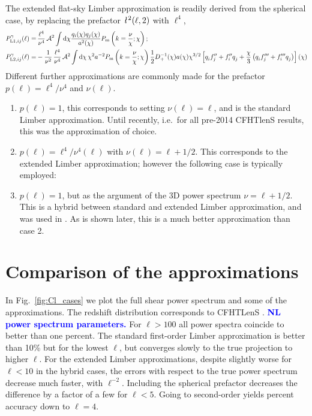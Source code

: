 \documentclass[fleqn,usenatbib]{mnras} %
\newcommand{\ellbar}{\hbox{\it \l}\,}
\newcommand{\pref}{{\cal A}}
\newcommand{\mk}[1]{{\bf\textcolor{blue}{#1}}}
\begin{document}
The extended flat-sky Limber approximation is readily derived from the
spherical case, by replacing the prefactor $\ellbar^2(\ell, 2)$ with $\ell^4$,
%
\begin{align}
  P^\gamma_{{\rm L1}, ij}(\ell) = & \, \frac{\ell^4}{\nu^4} \, \pref^2 \int {\rm d} \chi \frac{ q_i(\chi) q_j(\chi) }{a^2(\chi)}
  P_{\rm m}\left(k = \frac{\nu}{\chi}; \chi\right);
  \label{eq:P_ell_limber1}
  \\
    P^\gamma_{{\rm L2}, ij}(\ell) = & - \frac 1 {\nu^2} \, \frac{\ell^4}{\nu^4} \, \pref^2
    \int {\rm d} \chi \, \chi^{2} a^{-2} P_{\rm m}\left(k = \frac\nu\chi; \chi\right)
    \frac 1 2 D^{-1}_+(\chi) a(\chi) \chi^{3/2} \left[ q^{}_i f^{\prime\prime}_j + f^{\prime\prime}_i q^{}_j  
      + \frac{\chi}{3} \left( q^{}_i f^{\prime\prime\prime}_j + f^{\prime\prime\prime}_i q^{}_j
      \right)
    \right](\chi)
  \label{eq:P_ell_limber2}
\end{align}
%
Different further approximations are commonly made for the prefactor $p(\ell) = \ell^4/\nu^4$ and $\nu(\ell)$.
%
\begin{enumerate}
  \item $p(\ell) = 1$, this corresponds to setting $\nu(\ell) = \ell$, and is the standard Limber approximation.
    Until recently, i.e.~for all pre-2014 CFHTlenS results, this was the approximation of choice.
  \item $p(\ell) = \ell^4/\nu^4(\ell)$ with $\nu(\ell) = \ell + 1/2$. This corresponds to the extended Limber
    approximation; however the following case is typically employed:
  \item $p(\ell) = 1$, but as the argument of the 3D power spectrum $\nu = \ell + 1/2$. This is a hybrid between
    standard and extended Limber approximation, and was used in \cite{KiDS-450,joudaki/etal:2016}. As is shown
    later, this is a much better approximation than case 2.
\end{enumerate}

\section{Comparison of the approximations}
\label{sec:comp}

In Fig.~\ref{fig:Cl_cases} we plot the full shear power spectrum and some of
the approximations. The redshift distribution corresponds to CFHTLenS
\cite{CFHTLenS-2pt-notomo}. \mk{NL power spectrum parameters.}
For $\ell > 100$ all power spectra coincide to
better than one percent. The standard first-order Limber approximation is
better than 10\% but for the lowest $\ell$, but converges slowly to the true
projection to higher $\ell$. For the extended Limber approximations, despite
slightly worse for $\ell < 10$ in the hybrid cases, the errors with respect to
the true power spectrum decrease much faster, with $\ell^{-2}$. Including the
spherical prefactor decreases the difference by a factor of a few for $\ell <
5$. Going to second-order yields percent accuracy down to $\ell = 4$.
\end{document}
